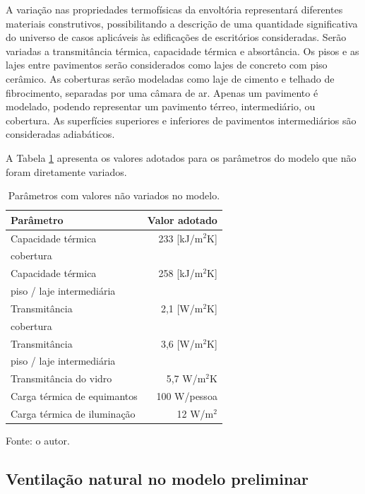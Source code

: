 \documentclass[brazil,hardcopy,openany,a5paper]{ufscthesis}
\begin{document}
		A variação nas propriedades termofísicas da envoltória representará diferentes materiais construtivos, possibilitando a descrição de uma quantidade significativa do universo de casos aplicáveis às edificações de escritórios consideradas. Serão variadas a transmitância térmica, capacidade térmica e absortância. Os pisos e as lajes entre pavimentos serão considerados como lajes de concreto com piso cerâmico. As coberturas serão modeladas como laje de cimento e telhado de fibrocimento, separadas por uma câmara de ar. Apenas um pavimento é modelado, podendo representar um pavimento térreo, intermediário, ou cobertura. As superfícies superiores e inferiores de pavimentos intermediários são consideradas adiabáticos. 
		
		A Tabela \ref{table:lajecob} apresenta os valores adotados para os parâmetros do modelo que não foram diretamente variados.
		
		\begin{table}[h]
			\centering
			\caption{Parâmetros com valores não variados no modelo.}
			\label{table:lajecob}
			\begin{tabular}{|l |r |}
				\hline
				\textbf{Parâmetro} & \textbf{Valor adotado} \\
				\hline
				Capacidade térmica & 233 [kJ/m$^2$K] \\
				cobertura &  \\
				\hline
				Capacidade térmica & 258 [kJ/m$^2$K] \\
				piso / laje intermediária &  \\
				\hline
				Transmitância & 2,1 [W/m$^2$K] \\
				cobertura &  \\
				\hline
				Transmitância & 3,6 [W/m$^2$K] \\
				piso / laje intermediária &  \\
				\hline
				Transmitância do vidro & 5,7 W/m$^2$K \\
				\hline
				Carga térmica de equimantos & 100 W/pessoa \\
				\hline
				Carga térmica de iluminação & 12 W/m$^2$ \\
				\hline
			\end{tabular}
			\begin{flushleft}
				Fonte: o autor.
			\end{flushleft}				
		\end{table}
		
		\subsection{Ventilação natural no modelo preliminar}
		
\end{document}
